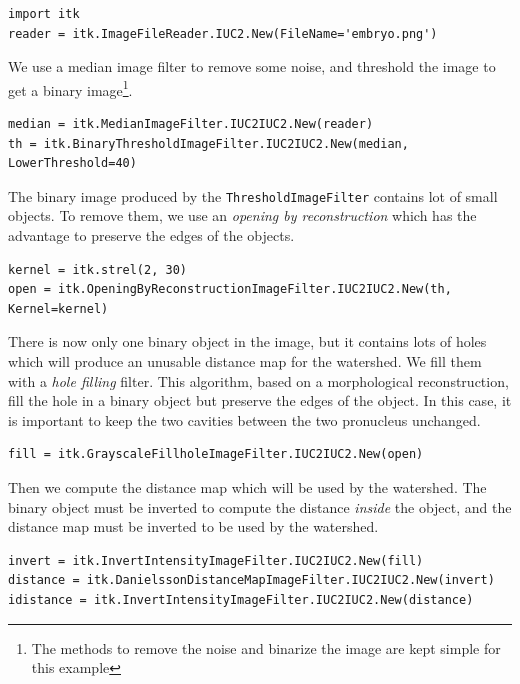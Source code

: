 \documentclass{InsightArticle}
\begin{document}
\small \begin{verbatim}
import itk
reader = itk.ImageFileReader.IUC2.New(FileName='embryo.png')
\end{verbatim} \normalsize

We use a median image filter to remove some noise, and threshold the image
to get a binary image\footnote{The methods to remove the noise and binarize the
image are kept simple for this example}.

\small \begin{verbatim}
median = itk.MedianImageFilter.IUC2IUC2.New(reader)
th = itk.BinaryThresholdImageFilter.IUC2IUC2.New(median, LowerThreshold=40)
\end{verbatim} \normalsize

The binary image produced by the \verb$ThresholdImageFilter$ contains lot
of small objects. To remove them, we use an {\em opening by reconstruction}
which has the advantage to preserve the edges of the objects.

\small \begin{verbatim}
kernel = itk.strel(2, 30)
open = itk.OpeningByReconstructionImageFilter.IUC2IUC2.New(th, Kernel=kernel)
\end{verbatim} \normalsize

There is now only one binary object in the image, but it contains lots of holes
which will produce an unusable distance map for the watershed. We fill them
with a {\em hole filling} filter. This algorithm, based on a morphological
reconstruction, fill the hole in a binary object but preserve the edges of the
object. In this case, it is important to keep the two cavities between the two
pronucleus unchanged.

\small \begin{verbatim}
fill = itk.GrayscaleFillholeImageFilter.IUC2IUC2.New(open)
\end{verbatim} \normalsize

Then we compute the distance map which will be used by the watershed. The
binary object must be inverted to compute the distance {\em inside} the
object, and the distance map must be inverted to be used by the watershed.

\small \begin{verbatim}
invert = itk.InvertIntensityImageFilter.IUC2IUC2.New(fill)
distance = itk.DanielssonDistanceMapImageFilter.IUC2IUC2.New(invert)
idistance = itk.InvertIntensityImageFilter.IUC2IUC2.New(distance)
\end{verbatim} \normalsize
\end{document}
